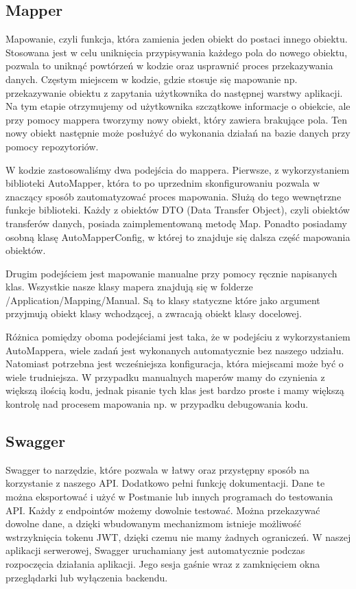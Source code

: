 \documentclass[a4paper,twoside,12pt]{book}
\begin{document}
\subsection{Mapper} 
Mapowanie, czyli funkcja, która zamienia jeden obiekt do postaci innego obiektu. Stosowana jest w celu uniknięcia przypisywania każdego pola do nowego obiektu, pozwala to uniknąć powtórzeń w kodzie oraz usprawnić proces przekazywania danych. Częstym miejscem w kodzie, gdzie stosuje się mapowanie np. przekazywanie obiektu z zapytania użytkownika do następnej warstwy aplikacji. Na tym etapie otrzymujemy od użytkownika szczątkowe informacje o obiekcie, ale przy pomocy mappera tworzymy nowy obiekt, który zawiera brakujące pola. Ten nowy obiekt następnie może posłużyć do wykonania działań na bazie danych przy pomocy repozytoriów.

W kodzie zastosowaliśmy dwa podejścia do mappera. Pierwsze, z wykorzystaniem biblioteki AutoMapper, która to po uprzednim skonfigurowaniu pozwala w znaczący sposób zautomatyzować proces mapowania. Służą do tego wewnętrzne funkcje biblioteki. Każdy z obiektów DTO (Data Transfer Object), czyli obiektów transferów danych, posiada zaimplementowaną metodę Map. Ponadto posiadamy osobną klasę AutoMapperConfig, w której to znajduje się dalsza część mapowania obiektów.

Drugim podejściem jest mapowanie manualne przy pomocy ręcznie napisanych klas. Wszystkie nasze klasy mapera znajdują się w folderze /Application/Mapping/Manual. Są to klasy statyczne które jako argument przyjmują obiekt klasy wchodzącej, a zwracają obiekt klasy docelowej.

Różnica pomiędzy oboma podejściami jest taka, że w podejściu z wykorzystaniem AutoMappera, wiele zadań jest wykonanych automatycznie bez naszego udziału. Natomiast potrzebna jest wcześniejsza konfiguracja, która miejscami może być o wiele trudniejsza. W przypadku manualnych maperów mamy do czynienia z większą ilością kodu, jednak pisanie tych klas jest bardzo proste i mamy większą kontrolę nad procesem mapowania np. w przypadku debugowania kodu.

\subsection{Swagger}
Swagger to narzędzie, które pozwala w łatwy oraz przystępny sposób na korzystanie z naszego API. Dodatkowo pełni funkcję dokumentacji. Dane te można eksportować i użyć w Postmanie lub innych programach do testowania API. Każdy z endpointów możemy dowolnie testować. Można przekazywać dowolne dane, a dzięki wbudowanym mechanizmom istnieje możliwość wstrzyknięcia tokenu JWT, dzięki czemu nie mamy żadnych ograniczeń. W naszej aplikacji serwerowej, Swagger uruchamiany jest automatycznie podczas rozpoczęcia działania aplikacji. Jego sesja gaśnie wraz z zamknięciem okna przeglądarki lub wyłączenia backendu.
\end{document}
